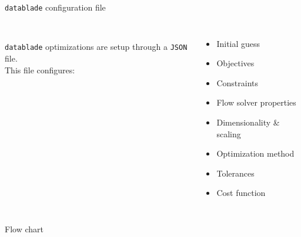 \begin{frame}[fragile]{\texttt{datablade} configuration file}
    \begin{columns}
        
        
        \\ [0.2cm]
        \texttt{datablade} optimizations are setup through a \texttt{JSON} file. 
        \\ [0.2cm]
        This file configures: 
        \begin{itemize}
            \item Initial guess
            \item Objectives
            \item Constraints
            \item Flow solver properties 
            \item Dimensionality \& scaling
            \item Optimization method
            \item Tolerances
            \item Cost function 
        \end{itemize}
    \end{columns}
\end{frame}

\begin{frame}{Flow chart}
    
\end{frame}